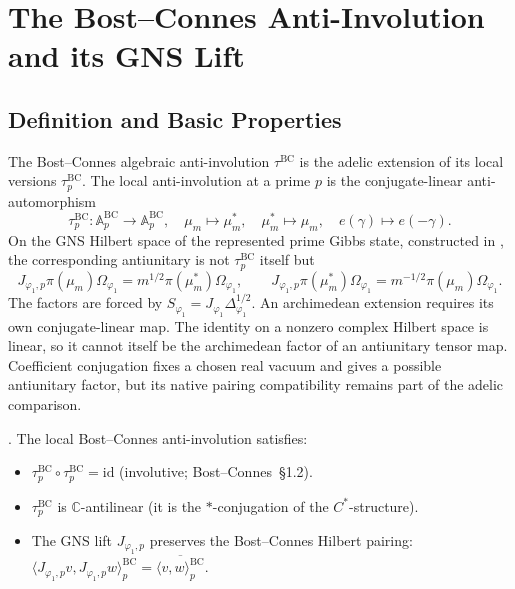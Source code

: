 \section{The Bost--Connes Anti-Involution and its GNS Lift}
\label{v4-arith:kp:BC-involution}

\subsection{Definition and Basic Properties}
\label{v4-arith:kp:BC-involution:def}

The Bost--Connes algebraic anti-involution
\(\tau^{\mathrm{BC}}\) is the adelic extension of its local versions
\(\tau^{\mathrm{BC}}_{p}\). The local anti-involution at a prime \(p\)
is the conjugate-linear anti-automorphism
\begin{equation}
\label{v4-arith:kp:eq:BC-involution-local}
\tau^{\mathrm{BC}}_{p}\colon\mathbb{A}^{\mathrm{BC}}_{p}\to\mathbb{A}^{\mathrm{BC}}_{p},
\quad
\mu_{m}\mapsto\mu_{m}^{*},\quad
\mu_{m}^{*}\mapsto\mu_{m},\quad
e(\gamma)\mapsto e(-\gamma).
\end{equation}
On the GNS Hilbert space of the represented prime Gibbs state,
constructed in , the corresponding
antiunitary is not \(\tau^{\mathrm{BC}}_{p}\) itself but
\[
J_{\varphi_{1},p}\pi(\mu_m)\Omega_{\varphi_{1}}
=m^{1/2}\pi(\mu_m^{*})\Omega_{\varphi_{1}},\qquad
J_{\varphi_{1},p}\pi(\mu_m^{*})\Omega_{\varphi_{1}}
=m^{-1/2}\pi(\mu_m)\Omega_{\varphi_{1}} .
\]
The factors are forced by
\(S_{\varphi_{1}}=J_{\varphi_{1}}\Delta_{\varphi_{1}}^{1/2}\). An archimedean extension requires its own conjugate-linear map.
The identity on a nonzero complex Hilbert space is linear, so it
cannot itself be the archimedean factor of an antiunitary tensor
map. Coefficient conjugation fixes a chosen real vacuum and gives
a possible antiunitary factor, but its native pairing compatibility
remains part of the adelic comparison.

\begin{lemma}
\label{v4-arith:kp:lem:involution-properties}
\ClaimStatusProvedElsewhere. The local Bost--Connes anti-involution
satisfies:
\begin{itemize}
\item \(\tau^{\mathrm{BC}}_{p}\circ\tau^{\mathrm{BC}}_{p}=\mathrm{id}\)
(involutive; Bost--Connes~\S1.2).
\item \(\tau^{\mathrm{BC}}_{p}\) is \(\mathbb{C}\)-antilinear
(it is the \(*\)-conjugation of the \(C^{*}\)-structure).
\item The GNS lift \(J_{\varphi_{1},p}\) preserves the Bost--Connes
Hilbert pairing:
\(\langle J_{\varphi_{1},p}v,J_{\varphi_{1},p}w\rangle^{\mathrm{BC}}_{p}
=\overline{\langle v,w\rangle^{\mathrm{BC}}_{p}}\).
\end{itemize}
\end{lemma}

